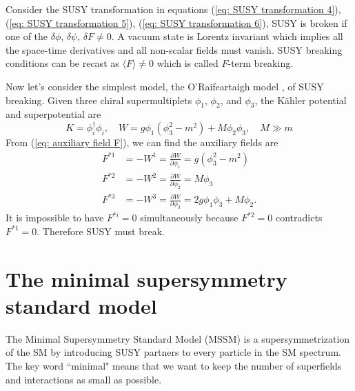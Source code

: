 \documentclass[12pt]{report}
\begin{document}
Consider the SUSY transformation in equations (\ref{eq: SUSY transformation 4}), (\ref{eq: SUSY transformation 5}), (\ref{eq: SUSY transformation 6}), SUSY is broken if one of the $\delta \phi$, $\delta \psi$, $\delta F \neq 0$.
A vacuum state is Lorentz invariant which implies all the space-time derivatives and all non-scalar fields must vanish.
SUSY breaking conditions can be recast as $\langle F \rangle \neq 0$ which is called $F$-term breaking.

Now let's consider the simplest model, the O'Raifeartaigh model \cite{O_Raifeartaigh},  of SUSY breaking. Given three chiral supermultiplets $\phi_{1}$, $\phi_{2}$, and $\phi_{3}$, the K\"{a}hler potential and superpotential are 
\begin{equation}
K = \phi^{\dag}_{i} \phi_{i}, \quad
W = g \phi_{1} ( \phi^{2}_{3} - m^{2}) + M \phi_{2} \phi_{3}, \quad
M \gg m
\end{equation}
From (\ref{eq: auxiliary field F}), we can find the auxiliary fields are
\begin{align}
F^{*1} &= - W^{1} = \frac{\partial W}{\partial \phi_{1}} = g ( \phi^{2}_{3} - m^{2})\\
F^{*2} &= - W^{2} = \frac{\partial W}{\partial \phi_{2}} = M \phi_{3}\\
F^{*3} &= - W^{3} = \frac{\partial W}{\partial \phi_{3}} = 2 g \phi_{1} \phi_{3} + M \phi_{2} .
\end{align}
It is impossible to have $F^{*i} = 0$ simultaneously because $F^{*2} = 0$ contradicts $F^{*1} = 0$.
Therefore SUSY must break.





\chapter{The minimal supersymmetry standard model}
The Minimal Supersymmetry Standard Model (MSSM) is a supersymmetrization of the SM by introducing SUSY partners to every particle in the SM spectrum. 
The key word ``minimal" means that we want to keep the number of superfields and interactions as small as possible. 
\end{document}
